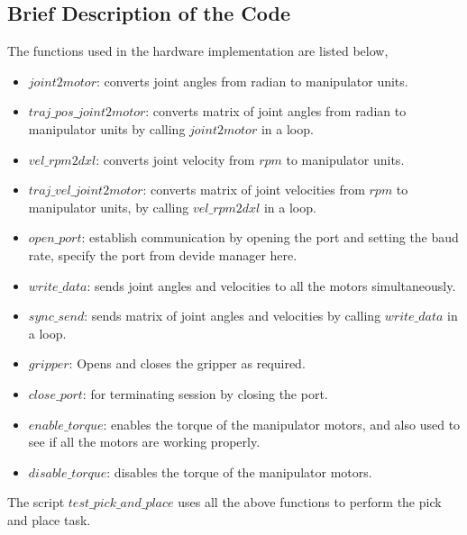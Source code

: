 \subsection{Brief Description of the Code} \label{subsec:brief_description_code}
The functions used in the hardware implementation are listed below,
\begin{itemize}
        \item  $joint2motor$: converts joint angles from radian to manipulator units.
        \item  $traj\_pos\_joint2motor$: converts matrix of joint angles from radian to manipulator units by calling $joint2motor$ in a loop.
        \item  $vel\_rpm2dxl$: converts joint velocity from $rpm$ to manipulator units.
        \item  $traj\_vel\_joint2motor$: converts matrix of joint velocities from $rpm$ to manipulator units, by calling $vel\_rpm2dxl$ in a loop.
        \item  $open\_port$: establish communication by opening the port and setting the baud rate, specify the port from devide manager here.
        \item  $write\_data$: sends joint angles and velocities to all the motors simultaneously.
        \item  $sync\_send$: sends matrix of joint angles and velocities by calling $write\_data$ in a loop.
        \item  $gripper$: Opens and closes the gripper as required.
        \item  $close\_port$: for terminating session by closing the port.
        \item  $enable\_torque$: enables the torque of the manipulator motors, and also used to see if all the motors are working properly.
        \item  $disable\_torque$: disables the torque of the manipulator motors.
\end{itemize}
The script $test\_pick\_and\_place$ uses all the above functions to perform the pick and place task.

\cleardoublepage

